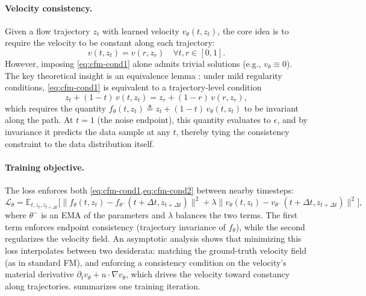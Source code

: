 \paragraph{Velocity consistency.} Given a flow trajectory $z_t$ with learned velocity $v_\theta(t, z_t)$, the core idea is to require the velocity to be constant along each trajectory:
\begin{equation}
    v(t, z_t) = v(r, z_r) \quad \forall t, r \in [0,1].
    \label{eq:cfm-cond1}
\end{equation}
However, imposing \cref{eq:cfm-cond1} alone admits trivial solutions (e.g., $v_\theta \equiv 0$). The key theoretical insight is an equivalence lemma \citep{zhou2024consistency}: under mild regularity conditions, \cref{eq:cfm-cond1} is equivalent to a trajectory-level condition
\begin{equation}
    z_t + (1-t) \, v(t, z_t) = z_r + (1-r) \, v(r, z_r),
    \label{eq:cfm-cond2}
\end{equation}
which requires the quantity $f_\theta(t, z_t) \triangleq z_t + (1-t) \, v_\theta(t, z_t)$ to be invariant along the path. At $t = 1$ (the noise endpoint), this quantity evaluates to $\epsilon$, and by invariance it predicts the data sample at any $t$, thereby tying the consistency constraint to the data distribution itself.

\paragraph{Training objective.} The loss enforces both \cref{eq:cfm-cond1,eq:cfm-cond2} between nearby timesteps:
\begin{equation}
    \mathcal{L}_\theta = \mathbb{E}_{t, z_t, z_{t+\Delta t}} \Big[ \| f_\theta(t, z_t) - f_{\theta^-}(t+\Delta t, z_{t+\Delta t}) \|^2 + \lambda \| v_\theta(t, z_t) - v_{\theta^-}(t+\Delta t, z_{t+\Delta t}) \|^2 \Big],
\end{equation}
where $\theta^-$ is an EMA of the parameters and $\lambda$ balances the two terms. The first term enforces endpoint consistency (trajectory invariance of $f_\theta$), while the second regularizes the velocity field. An asymptotic analysis \citep{zhou2024consistency} shows that minimizing this loss interpolates between two desiderata: matching the ground-truth velocity field (as in standard FM), and enforcing a consistency condition on the velocity's material derivative $\partial_t v_\theta + u \cdot \nabla v_\theta$, which drives the velocity toward constancy along trajectories.  summarizes one training iteration.

